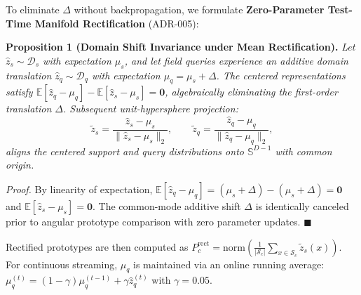 To eliminate $\Delta$ without backpropagation, we formulate \textbf{Zero-Parameter Test-Time Manifold Rectification} (ADR-005):

\noindent\textbf{Proposition 1 (Domain Shift Invariance under Mean Rectification).}
\textit{Let $\hat{z}_s \sim \mathcal{D}_s$ with expectation $\mu_s$, and let field queries experience an additive domain translation $\hat{z}_q \sim \mathcal{D}_q$ with expectation $\mu_q = \mu_s + \Delta$. The centered representations satisfy $\mathbb{E}[\hat{z}_q - \mu_q] - \mathbb{E}[\hat{z}_s - \mu_s] = \mathbf{0}$, algebraically eliminating the first-order translation $\Delta$. Subsequent unit-hypersphere projection:
\begin{equation}
    \tilde{z}_s = \frac{\hat{z}_s - \mu_s}{\| \hat{z}_s - \mu_s \|_2}, \qquad \tilde{z}_q = \frac{\hat{z}_q - \mu_q}{\| \hat{z}_q - \mu_q \|_2},
    \label{eq:centering_transformation}
\end{equation}
aligns the centered support and query distributions onto $\mathbb{S}^{D-1}$ with common origin.}

\textit{Proof.} By linearity of expectation, $\mathbb{E}[\hat{z}_q - \mu_q] = (\mu_s + \Delta) - (\mu_s + \Delta) = \mathbf{0}$ and $\mathbb{E}[\hat{z}_s - \mu_s] = \mathbf{0}$. The common-mode additive shift $\Delta$ is identically canceled prior to angular prototype comparison with zero parameter updates. \hfill $\blacksquare$

Rectified prototypes are then computed as $P_c^{\text{rect}} = \text{norm}\left( \frac{1}{|\mathcal{S}_c|} \sum_{x \in \mathcal{S}_c} \tilde{z}_s(x) \right)$. For continuous streaming, $\mu_q$ is maintained via an online running average: $\mu_q^{(t)} = (1 - \gamma)\mu_q^{(t-1)} + \gamma \hat{z}_q^{(t)}$ with $\gamma = 0.05$.

